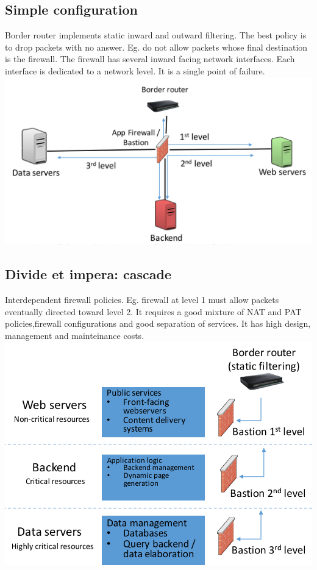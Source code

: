 \documentclass[10pt,a4paper]{book}
\begin{document}
\subsection{Simple configuration}
Border router implements static inward and outward filtering. The best policy is to drop packets with no answer. Eg. do not allow packets whose final destination is the firewall.  The firewall has several inward facing network interfaces. Each interface is dedicated to a network level. It is a single point of failure.\\
\includegraphics[scale=0.3]{firewall/simple.png}
\subsection{Divide et impera: cascade}
Interdependent firewall policies. Eg. firewall at level 1 must allow packets eventually directed toward level 2. It requires a good mixture of NAT and PAT policies,firewall configurations and good separation of services. It has high design, management and mainteinance costs.
\includegraphics[scale=0.3]{firewall/cascade.png}
\end{document}

